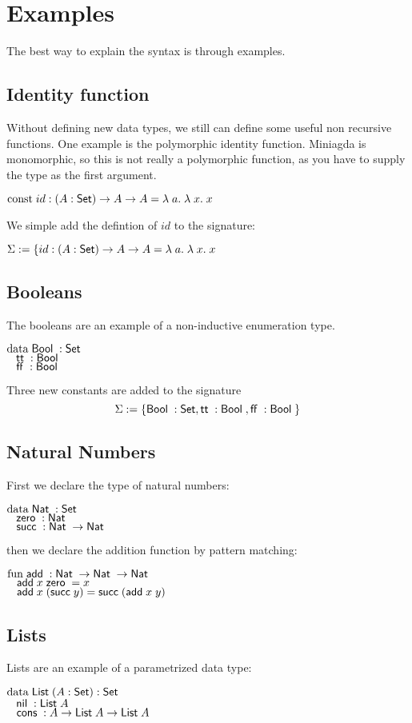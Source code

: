 \section{Examples}
The best way to explain the syntax is through examples.
\subsection{Identity function}
Without defining new data types, we still can define some useful non recursive functions.
One example is the polymorphic identity function. 
Miniagda is monomorphic, so this is not really a polymorphic function, as you have to supply the
type as the first argument.
\begin{bsp}
$\mathrm{const}\; id : ( A : \mathsf{Set} ) \rightarrow{A \rightarrow A} = \lambda\; a .\;\lambda\; x .\;x$   
\end{bsp}
We simple add the defintion of $id$ to the signature:
\begin{bsp}
$\Sigma := \{ id : ( A : \mathsf{Set} ) \rightarrow{A \rightarrow A} = \lambda\; a .\;\lambda\; x .\;x$
\end{bsp}
\subsection{Booleans}
The booleans are an example of a non-inductive enumeration type.
\begin{bsp}
$\mathrm{data}\; \mathsf{Bool}\; : \mathsf{Set}$  \\
$\hspace*{3mm} \mathsf{tt}\; : \mathsf{Bool}\; $\\
$\hspace*{3mm} \mathsf{ff}\; : \mathsf{Bool}\; $
\end{bsp}
Three new constants are added to the signature
\[ \Sigma := \{ \mathsf{Bool}\; : \mathsf{Set} , \mathsf{tt}\; : \mathsf{Bool}\; , \mathsf{ff}\; : \mathsf{Bool}\; \} \]
\subsection{Natural Numbers}
First we declare the type of natural numbers:
\begin{bsp}
$\mathrm{data}\; \mathsf{Nat}\; : \mathsf{Set}$ \\
$\hspace*{3mm} \mathsf{zero}\; : \mathsf{Nat}\; $\\
$\hspace*{3mm} \mathsf{succ}\; : \mathsf{Nat}\; \rightarrow \mathsf{Nat}\;$
\end{bsp}
then we declare the addition function by pattern matching:
\begin{bsp}
$\mathrm{fun}\; \mathsf{add}\; : \mathsf{Nat}\; \rightarrow \mathsf{Nat}\; \rightarrow \mathsf{Nat}\;$\\
$\hspace*{3mm} \mathsf{add}\; x \; \mathsf{zero}\; = x $\\
$\hspace*{3mm} \mathsf{add}\; x \; (\mathsf{succ}\; y) = \mathsf{succ}\; (\mathsf{add}\; x \; y)  $
\end{bsp}
\subsection{Lists}
Lists are an example of a parametrized data type:
\begin{bsp}
$\mathrm{data}\; \mathsf{List}\; ( A : \mathsf{Set} ) : \mathsf{Set} $ \\
$ \hspace*{3mm} \mathsf{nil}\; : \mathsf{List}\; A  $\\
$ \hspace*{3mm} \mathsf{cons}\; : A \rightarrow \mathsf{List}\; A \rightarrow \mathsf{List}\; A $
\end{bsp}

